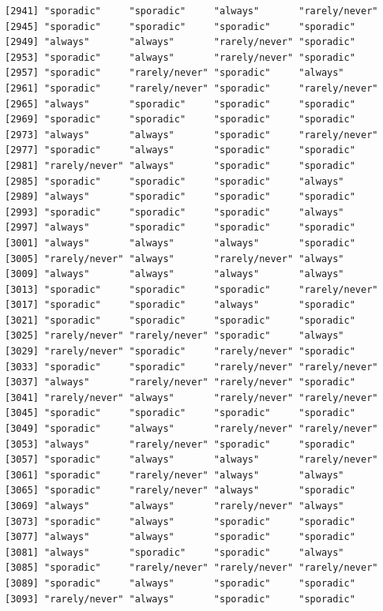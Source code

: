 \documentclass[
  letterpaper,
  DIV=11,
  numbers=noendperiod]{scrartcl}
\begin{document}
\begin{verbatim}
[2941] "sporadic"     "sporadic"     "always"       "rarely/never"
[2945] "sporadic"     "sporadic"     "sporadic"     "sporadic"    
[2949] "always"       "always"       "rarely/never" "sporadic"    
[2953] "sporadic"     "always"       "rarely/never" "sporadic"    
[2957] "sporadic"     "rarely/never" "sporadic"     "always"      
[2961] "sporadic"     "rarely/never" "sporadic"     "rarely/never"
[2965] "always"       "sporadic"     "sporadic"     "sporadic"    
[2969] "sporadic"     "sporadic"     "sporadic"     "sporadic"    
[2973] "always"       "always"       "sporadic"     "rarely/never"
[2977] "sporadic"     "always"       "sporadic"     "sporadic"    
[2981] "rarely/never" "always"       "sporadic"     "sporadic"    
[2985] "sporadic"     "sporadic"     "sporadic"     "always"      
[2989] "always"       "sporadic"     "sporadic"     "sporadic"    
[2993] "sporadic"     "sporadic"     "sporadic"     "always"      
[2997] "always"       "sporadic"     "sporadic"     "sporadic"    
[3001] "always"       "always"       "always"       "sporadic"    
[3005] "rarely/never" "always"       "rarely/never" "always"      
[3009] "always"       "always"       "always"       "always"      
[3013] "sporadic"     "sporadic"     "sporadic"     "rarely/never"
[3017] "sporadic"     "sporadic"     "always"       "sporadic"    
[3021] "sporadic"     "sporadic"     "sporadic"     "sporadic"    
[3025] "rarely/never" "rarely/never" "sporadic"     "always"      
[3029] "rarely/never" "sporadic"     "rarely/never" "sporadic"    
[3033] "sporadic"     "sporadic"     "rarely/never" "rarely/never"
[3037] "always"       "rarely/never" "rarely/never" "sporadic"    
[3041] "rarely/never" "always"       "rarely/never" "rarely/never"
[3045] "sporadic"     "sporadic"     "sporadic"     "sporadic"    
[3049] "sporadic"     "always"       "rarely/never" "rarely/never"
[3053] "always"       "rarely/never" "sporadic"     "sporadic"    
[3057] "sporadic"     "always"       "always"       "rarely/never"
[3061] "sporadic"     "rarely/never" "always"       "always"      
[3065] "sporadic"     "rarely/never" "always"       "sporadic"    
[3069] "always"       "always"       "rarely/never" "always"      
[3073] "sporadic"     "always"       "sporadic"     "sporadic"    
[3077] "always"       "always"       "sporadic"     "sporadic"    
[3081] "always"       "sporadic"     "sporadic"     "always"      
[3085] "sporadic"     "rarely/never" "rarely/never" "rarely/never"
[3089] "sporadic"     "always"       "sporadic"     "sporadic"    
[3093] "rarely/never" "always"       "sporadic"     "sporadic"    

\end{verbatim}
\end{document}
